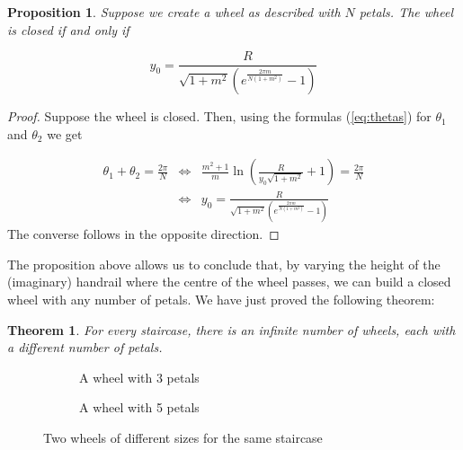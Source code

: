 \documentclass{article}
\theoremstyle{theorem}
\newtheorem{prop}{Proposition}[section]
\theoremstyle{theorem}
\newtheorem{thm}{Theorem}[section]
\begin{document}
\begin{prop}
  Suppose we create a wheel as described with $N$ petals. The wheel is
  closed if and only if

  \begin{equation}
    \label{eq:y0}
    y_0=\frac{R}{\sqrt{1+m^2}\left(e^{\frac{2\pi m}{N(1+m^2)}}-1\right)}
  \end{equation}

\end{prop}

\begin{proof}
  Suppose the wheel is closed. Then, using the formulas
  (\ref{eq:thetas}) for $\theta_1$ and $\theta_2$ we get

  \begin{equation}
    \begin{array}{lcl}
      \theta_1+\theta_2=\frac{2\pi}{N} & \Leftrightarrow &
      \frac{m^2+1}{m}
      \ln\left(\frac{R}{y_0\sqrt{1+m^2}}+1\right)=\frac{2\pi}{N} \\
      & \Leftrightarrow
      & y_0=\frac{R}{\sqrt{1+m^2}\left(e^{\frac{2\pi
              m}{N(1+m^2)}}-1\right)}
    \end{array}
  \end{equation}
  The converse follows in the opposite direction.
\end{proof}

The proposition above allows us to conclude that, by varying the
height of the (imaginary) handrail where the centre of the wheel
passes, we can build a closed wheel with any number of petals. We have
just proved the following theorem:

\begin{thm}
  For every staircase, there is an infinite number of wheels, each
  with a different number of petals.
\end{thm}

\begin{figure}[h]
  \centering
  \begin{subfigure}[t]{.45\textwidth}
    \centering 
    \caption{A wheel with 3 petals}
    \label{fig:wheel4}
  \end{subfigure}
  \begin{subfigure}[t]{.45\textwidth}
    \centering 
    \caption{A wheel with 5 petals}
    \label{fig:wheel5}
  \end{subfigure}
  \caption{Two wheels of different sizes for the same staircase}
  \label{fig:wheels}
\end{figure}
\end{document}
